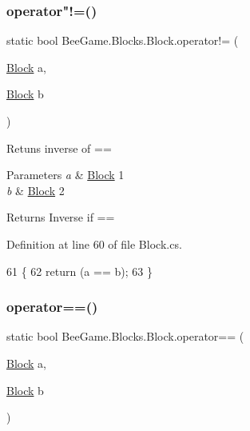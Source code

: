 \subsubsection{\texorpdfstring{operator"!=()}{operator!=()}}
{\footnotesize\ttfamily static bool Bee\+Game.\+Blocks.\+Block.\+operator!= (\begin{DoxyParamCaption}\item[{\hyperlink{class_bee_game_1_1_blocks_1_1_block}{Block}}]{a,  }\item[{\hyperlink{class_bee_game_1_1_blocks_1_1_block}{Block}}]{b }\end{DoxyParamCaption})\hspace{0.3cm}{\ttfamily [static]}}



Retuns inverse of == 


\begin{DoxyParams}{Parameters}
{\em a} & \hyperlink{class_bee_game_1_1_blocks_1_1_block}{Block} 1\\
\hline
{\em b} & \hyperlink{class_bee_game_1_1_blocks_1_1_block}{Block} 2\\
\hline
\end{DoxyParams}
\begin{DoxyReturn}{Returns}
Inverse if ==
\end{DoxyReturn}


Definition at line 60 of file Block.\+cs.


\begin{DoxyCode}
61         \{
62             \textcolor{keywordflow}{return} (a == b);
63         \}
\end{DoxyCode}
\mbox{\label{class_bee_game_1_1_blocks_1_1_block_a620f4aba15b9280f1c659dc4557f8cd8}} 
\subsubsection{\texorpdfstring{operator==()}{operator==()}}
{\footnotesize\ttfamily static bool Bee\+Game.\+Blocks.\+Block.\+operator== (\begin{DoxyParamCaption}\item[{\hyperlink{class_bee_game_1_1_blocks_1_1_block}{Block}}]{a,  }\item[{\hyperlink{class_bee_game_1_1_blocks_1_1_block}{Block}}]{b }\end{DoxyParamCaption})\hspace{0.3cm}{\ttfamily [static]}}



